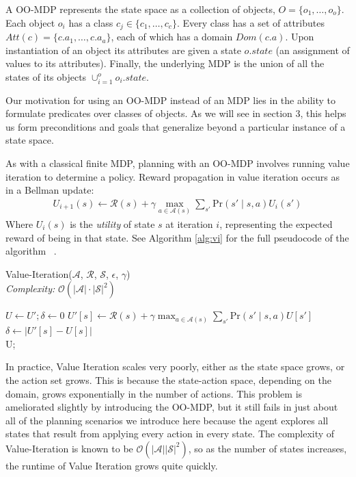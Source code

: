 \documentclass[]{article}
\begin{document}
A OO-MDP represents the state space as a collection of objects,
$O = \{o_1, \ldots, o_o \}$.  Each object $o_i$ has a
class $c_j \in  \{c_1, \ldots, c_c\}$. Every class has a set of attributes
$Att(c) = \{c.a_1, \ldots, c.a_a \}$, each of which has a domain $Dom(c.a)$.
Upon instantiation of an object its attributes are given a state $o.state$
(an assignment of values to its attributes).  Finally, the underlying MDP is the union
of all the states of its objects $\cup_{i = 1}^o o_i.state$. ~\citep{diuk08}

Our motivation for using an OO-MDP instead of an MDP lies in the
ability to formulate predicates over classes of objects. As we will
see in section 3, this helps us form preconditions and goals that
generalize beyond a particular instance of a state space.

As with a classical finite MDP, planning with an OO-MDP involves
running value iteration to determine a policy.  Reward propagation in
value iteration occurs as in a Bellman update:
\begin{align}
U_{i+1}(s) \leftarrow \mathcal{R}(s) + \gamma \max_{a \in \mathcal{A}(s)} \sum_{s'} \text{Pr}(s' \mid s, a)U_i(s')
\end{align}
Where $U_i(s)$ is the {\it utility} of state $s$ at iteration $i$, 
representing the expected reward of being in that state. See Algorithm \ref{alg:vi} for the full pseudocode of the algorithm ~\citep{russellnorvigAI}.

\begin{algorithm}
  \caption{Value-Iteration($\mathcal{A}$, $\mathcal{R}$, $\mathcal{S}$, $\epsilon$, $\gamma$) \\ {\it Complexity:} $\mathcal{O}(|\mathcal{A}|\cdot |\mathcal{S}|^2)$}
  \begin{algorithmic}[1]
    \State $U \gets U';\delta \gets 0$
    \State $U'[s] \leftarrow \mathcal{R}(s) + \gamma \max_{a \in \mathcal{A}(s)} \sum_{s'} \text{Pr}(s'\mid s,a) U[s']$
    	\State $\delta \gets |U'[s] - U[s]|$ 
    \EndIf
    \EndFor
    \EndWhile \\
    \Return U;
  \end{algorithmic}
  \label{alg:vi}
\end{algorithm}


In practice, Value Iteration scales very poorly, either as the state
space grows, or the action set grows. This is because the state-action
space, depending on the domain, grows exponentially in the number of
actions.  This problem is ameliorated slightly by introducing the
OO-MDP, but it still fails in just about all of the planning scenarios
we introduce here because the agent explores all states that result
from applying every action in every state.  The complexity of Value-Iteration
is known to be $\mathcal{O}(|\mathcal{A}||\mathcal{S}|^2)$, so as the number
of states increases, the runtime of Value Iteration grows quite quickly.
\end{document}

